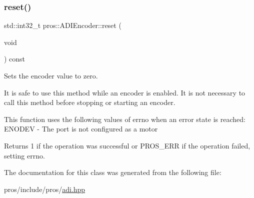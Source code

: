 \subsubsection{\texorpdfstring{reset()}{reset()}}
{\footnotesize\ttfamily std\+::int32\+\_\+t pros\+::\+A\+D\+I\+Encoder\+::reset (\begin{DoxyParamCaption}\item[{void}]{ }\end{DoxyParamCaption}) const}

Sets the encoder value to zero.

It is safe to use this method while an encoder is enabled. It is not necessary to call this method before stopping or starting an encoder.

This function uses the following values of errno when an error state is reached\+: E\+N\+O\+D\+EV -\/ The port is not configured as a motor

\begin{DoxyReturn}{Returns}
1 if the operation was successful or P\+R\+O\+S\+\_\+\+E\+RR if the operation failed, setting errno. 
\end{DoxyReturn}


The documentation for this class was generated from the following file\+:\begin{DoxyCompactItemize}
\item 
pros/include/pros/\hyperlink{adi_8hpp}{adi.\+hpp}\end{DoxyCompactItemize}
